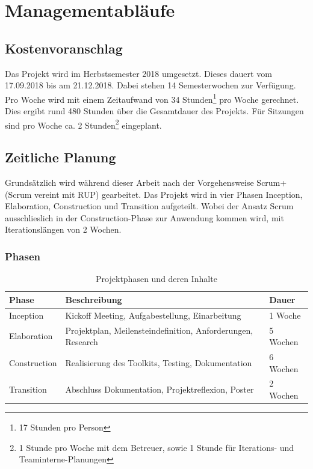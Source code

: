 
\section{Managementabläufe}
\subsection{Kostenvoranschlag}
Das Projekt wird im Herbstsemester 2018 umgesetzt. Dieses dauert vom 17.09.2018 bis am 21.12.2018. Dabei stehen 14 Semesterwochen zur Verfügung. Pro Woche wird mit einem Zeitaufwand von 34 Stunden\footnote{ 17 Stunden pro Person} pro Woche gerechnet. Dies ergibt rund 480 Stunden über die Gesamtdauer des Projekts. Für Sitzungen sind pro Woche ca. 2 Stunden\footnote{ 1 Stunde pro Woche mit dem Betreuer, sowie 1 Stunde für Iterations- und Teaminterne-Planungen} eingeplant. 

\subsection{Zeitliche Planung}
Grundsätzlich wird während dieser Arbeit nach der Vorgehensweise Scrum+ (Scrum vereint mit RUP) gearbeitet. Das Projekt wird in vier Phasen Inception, Elaboration, Construction und Transition aufgeteilt. Wobei der Ansatz Scrum ausschlieslich in der Construction-Phase zur Anwendung kommen wird, mit Iterationslängen von 2 Wochen.

\subsubsection{Phasen}
\begin{table}[H]
    \centering
    \def\arraystretch{2}
    \begin{tabular}{| p{2.5cm} | p{10.5cm} | p{3cm} |} \hline
        \textbf{Phase} & \textbf{Beschreibung} & \textbf{Dauer} \\ \hline
        Inception & Kickoff Meeting, Aufgabestellung, Einarbeitung & 1 Woche \\ \hline
        Elaboration & Projektplan, Meilensteindefinition, Anforderungen, Research & 5 Wochen \\ \hline
        Construction & Realisierung des Toolkits, Testing, Dokumentation & 6 Wochen \\ \hline 
        Transition & Abschluss Dokumentation, Projektreflexion, Poster & 2 Wochen \\ \hline
    \end{tabular}
    \caption{Projektphasen und deren Inhalte}
\end{table}

